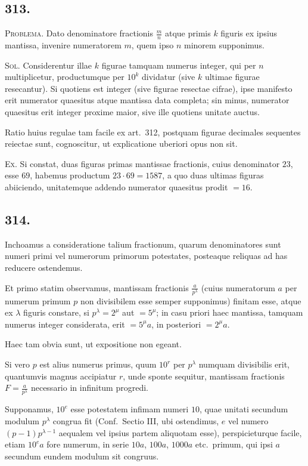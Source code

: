 \documentclass[12pt,a4paper]{article}
\theoremstyle{plain}
\theoremstyle{definition}
\theoremstyle{remark}
\begin{document}
\subsection*{313.}

\textsc{Problema.} Dato denominatore fractionis $\tfrac{m}{n}$ atque primis $k$ figuris
ex ipsius mantissa, invenire numeratorem $m$, quem ipso $n$ minorem
supponimus.

\textsc{Sol.} Considerentur illae $k$ figurae tamquam numerus integer, qui per
$n$ multiplicetur, productumque per $10^k$ dividatur (sive $k$ ultimae figurae
resecantur). Si quotiens est integer (sive figurae resectae cifrae), ipse manifesto
erit numerator quaesitus atque mantissa data completa; sin minus, numerator
quaesitus erit integer proxime maior, sive ille quotiens unitate auctus.

Ratio huius regulae tam facile ex art.\@~312, postquam figurae decimales
sequentes reiectae sunt, cognoscitur, ut explicatione uberiori opus non sit.

\textsc{Ex.} Si constat, duas figuras primas mantissae fractionis, cuius
denominator $23$, esse $69$, habemus productum $23 \cdot 69 = 1587$, a quo duas
ultimas figuras abiiciendo, unitatemque addendo numerator quaesitus prodit $= 16$.

\subsection*{314.}

Inchoamus a consideratione talium fractionum, quarum denominatores sunt
numeri primi vel numerorum primorum potestates, posteaque reliquas ad has
reducere ostendemus.

Et primo statim observamus, mantissam fractionis $\tfrac{a}{p^\lambda}$ (cuius numeratorum
$a$ per numerum primum $p$ non divisibilem esse semper supponimus) finitam
esse, atque ex $\lambda$ figuris constare, si $p^\lambda = 2^\mu$ aut $= 5^\mu$; in casu priori
haec mantissa, tamquam numerus integer considerata, erit $= 5^\mu a$, in
posteriori $= 2^\mu a$.

Haec tam obvia sunt, ut expositione non egeant.

Si vero $p$ est alius numerus primus, quum $10^r$ per $p^\lambda$ numquam divisibilis
erit, quantumvis magnus accipiatur $r$, unde sponte sequitur, mantissam
fractionis $F = \tfrac{a}{p^\lambda}$ necessario in infinitum progredi.

Supponamus, $10^e$ esse potestatem infimam numeri $10$, quae unitati secundum
modulum $p^\lambda$ congrua fit (Conf.\ Sectio III, ubi ostendimus, $e$ vel numero
$(p-1)p^{\lambda-1}$ aequalem vel ipsius partem aliquotam esse), perspicieturque facile,
etiam $10^e a$ fore numerum, in serie $10a$, $100a$, $1000a$ etc.\ primum, qui ipsi
$a$ secundum eundem modulum sit congruus.
\end{document}
